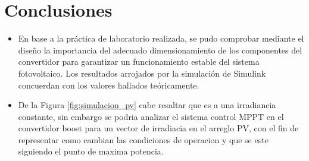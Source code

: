 \section*{Conclusiones}
\begin{itemize}
\item En base a la práctica de laboratorio realizada, se pudo comprobar mediante el diseño la importancia del adecuado dimensionamiento de los componentes del convertidor para garantizar un funcionamiento estable del sistema fotovoltaico. Los resultados arrojados por la simulación de Simulink concuerdan con los valores hallados teóricamente.

\item De la Figura \ref{fig:simulacion_pv} cabe resaltar que es a una irradiancia constante, sin embargo se podria analizar el sistema control MPPT en el convertidor boost para un vector de irradiacia en el arreglo PV, con el fin de representar como cambian las condiciones de operacion y que se este siguiendo el punto de maxima potencia.
\end{itemize}